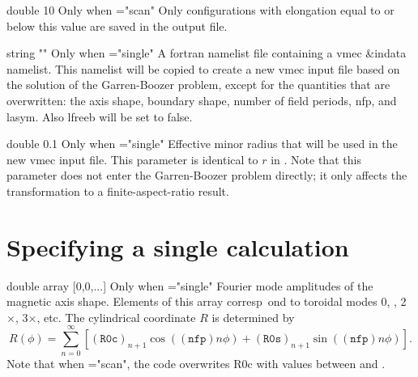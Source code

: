 \myhrule

{double}
{10}
{Only when ={\ttfamily "scan"}}
{Only configurations with elongation equal to or below this value are saved in the output file.}

\myhrule

{string}
{{\ttfamily ""}}
{Only when ={\ttfamily "single"}}
{A fortran namelist file containing a vmec {\ttfamily \&indata} namelist. This namelist will be copied to create a new vmec input file based on the solution of the Garren-Boozer problem, except for the quantities that are overwritten: the axis shape, boundary shape, number of field periods, {\ttfamily nfp}, and {\ttfamily lasym}. Also {\ttfamily lfreeb} will be set to false.}

\myhrule

{double}
{0.1}
{Only when ={\ttfamily "single"}}
{Effective minor radius that will be used in the new vmec input file.  This parameter is identical to $r$ in \cite{PaperII}. Note that this parameter does not enter the Garren-Boozer problem directly; it only affects the transformation to a finite-aspect-ratio result.}

\myhrule


\section{Specifying a single calculation}

{double array}
{[0,0,...]}
{Only when ={\ttfamily "single"}}
{Fourier mode amplitudes of the magnetic axis shape. Elements of this array corresp\
ond to toroidal modes 0, , 2$\times$, 3$\times$, etc.  The cylindrical coordinate $R$ is determined by
\begin{equation}
R(\phi) = \sum_{n=0}^{\infty} \left[ (\mathtt{R0c})_{n+1} \cos( (\mathtt{nfp})n\phi) +  (\mathtt{R0s})_{n+1} \sin( (\mathtt{nfp})n\phi)\right].
\label{eq:Rseries}
\end{equation}
Note that when ={\ttfamily "scan"}, the code overwrites {\ttfamily R0c} with values between  and .
}

